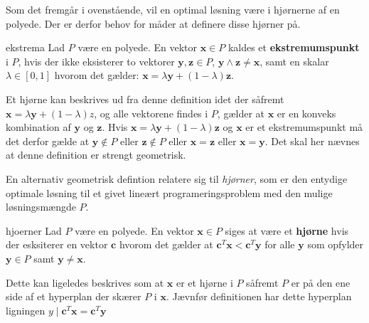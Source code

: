 Som det fremgår i ovenstående, vil en optimal løsning være i hjørnerne af en polyede.
Der er derfor behov for måder at definere disse hjørner på.

\begin{defn}{}{ekstrema}
Lad $P$ være en polyede. 
En vektor $\mathbf{x} \in P$ kaldes et \textbf{ekstremumspunkt} i $P$, hvis der ikke eksisterer to vektorer $\mathbf{y},\mathbf{z} \in P$, $\mathbf{y} \land \mathbf{z} \neq \mathbf{x}$, samt en skalar $\lambda \in [0,1]$ hvorom det gælder: $\mathbf{x}=\lambda\mathbf{y}+(1-\lambda)\textbf{z}$.
\end{defn}
\noindent
Et hjørne kan beskrives ud fra denne definition idet der såfremt $\mathbf{x}=\lambda\mathbf{y}+(1-\lambda)z$, og alle vektorene findes i $P$, gælder at $\mathbf{x}$ er en konveks kombination af $\mathbf{y}$ og $\mathbf{z}$.
Hvis $\mathbf{x}=\lambda\mathbf{y}+(1-\lambda)\textbf{z}$ og $\mathbf{x}$ er et ekstremumspunkt må det derfor gælde at $\mathbf{y}\notin P$ eller $\mathbf{z}\notin P$ eller $\mathbf{x}=\mathbf{z}$ eller $\mathbf{x}=\mathbf{y}$. 
Det skal her nævnes at denne definition er strengt geometrisk.



En alternativ geometrisk defintion relatere sig til \textit{hjørner}, som er den entydige optimale løsning til et givet lineært programeringsproblem med den mulige løsningsmængde $P$.
\begin{defn}{}{hjoerner}
Lad $P$ være en polyede. En vektor $\mathbf{x}\in P$ siges at være et \textbf{hjørne} hvis der esksiterer en vektor $\mathbf{c}$ hvorom det gælder at $\mathbf{c}^T\mathbf{x}<\mathbf{c}^T\mathbf{y}$ for alle $\mathbf{y}$ som opfylder $\mathbf{y} \in P$ samt $\mathbf{y}\neq\mathbf{x}$.
\end{defn}
Dette kan ligeledes beskrives som at $\mathbf{x}$ er et hjørne i $P$ såfremt $P$ er på den ene side af et hyperplan der skærer $P$ i $\mathbf{x}$. Jævnfør definitionen har dette hyperplan ligningen $y \mid \mathbf{c}^T\mathbf{x}=\mathbf{c}^T\mathbf{y}$